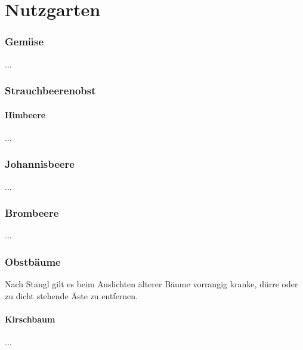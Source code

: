 \part{Nutzgarten}

\pagebreak

\section{Gemüse}
...

\section{Strauchbeerenobst}

\subsection{Himbeere}
...

\section{Johannisbeere}
...

\section{Brombeere}
...

\section{Obstbäume}
\label{Bäume}

Nach Stangl \cite[S.~256]{Stangl1995} gilt es beim Auslichten älterer Bäume vorrangig kranke, dürre oder zu dicht stehende Äste zu entfernen.

\subsection{Kirschbaum}
...



\pagebreak